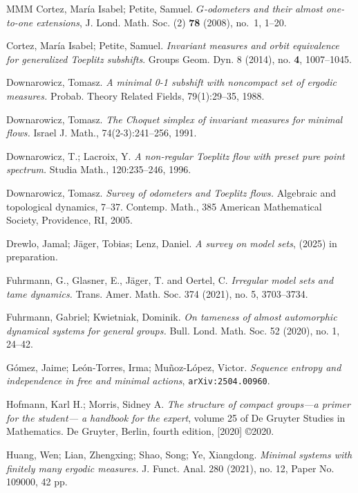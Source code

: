 \documentclass[titlepage,reqno,10pt]{amsart}
\theoremstyle{definition}
\begin{document}
\begin{thebibliography}{MMM}
Cortez, María Isabel; Petite, Samuel. \textit{$G$-odometers and their almost one-to-one extensions}, J. Lond. Math. Soc. (2) {\bf 78} (2008), no.~1, 1--20.

 Cortez, María Isabel; Petite, Samuel. \textit{Invariant measures and orbit equivalence for generalized Toeplitz subshifts}. Groups Geom. Dyn. 8 (2014), no. \textbf{4}, 1007--1045.

Downarowicz, Tomasz.
\textit{A minimal 0-1 subshift with noncompact set of ergodic measures.}
Probab. Theory Related Fields, 79(1):29--35, 1988.

Downarowicz, Tomasz.
\textit{The Choquet simplex of invariant measures for minimal flows.}
Israel J. Math., 74(2-3):241--256, 1991.

Downarowicz, T.; Lacroix, Y.
\textit{A non-regular Toeplitz flow with preset pure point spectrum.}
Studia Math., 120:235--246, 1996.

 Downarowicz, Tomasz. \textit{Survey of odometers and {T}oeplitz flows.} Algebraic and topological dynamics, 7--37. Contemp. Math., 385 American Mathematical Society, Providence, RI, 2005.

 Drewlo, Jamal; J{\"a}ger, Tobias;  Lenz, Daniel. \textit{A survey on model sets}, (2025) in preparation.

 Fuhrmann, G., Glasner, E., J\"ager, T. and Oertel, C. {\it Irregular model sets and tame dynamics.} Trans. Amer. Math. Soc. 374 (2021), no. 5, 3703--3734.

 Fuhrmann, Gabriel; Kwietniak, Dominik. 
\textit{On tameness of almost automorphic dynamical systems for general groups.} 
Bull. Lond. Math. Soc. 52 (2020), no. 1, 24--42.

 Gómez, Jaime; León-Torres, Irma; Muñoz-López, Victor. \textit{Sequence entropy and independence in free and minimal actions}, {\tt arXiv:2504.00960}.

 Hofmann, Karl H.; Morris, Sidney A. \textit{The structure of compact groups—a primer for the student— a handbook for the expert}, volume 25 of De Gruyter Studies in Mathematics. De Gruyter,
Berlin, fourth edition, [2020] ©2020.


 Huang, Wen; Lian, Zhengxing; Shao, Song; Ye, Xiangdong. \textit{Minimal systems with finitely many ergodic measures.} J. Funct. Anal. 280 (2021), no. 12, Paper No. 109000, 42 pp.


\end{thebibliography}
\end{document}
